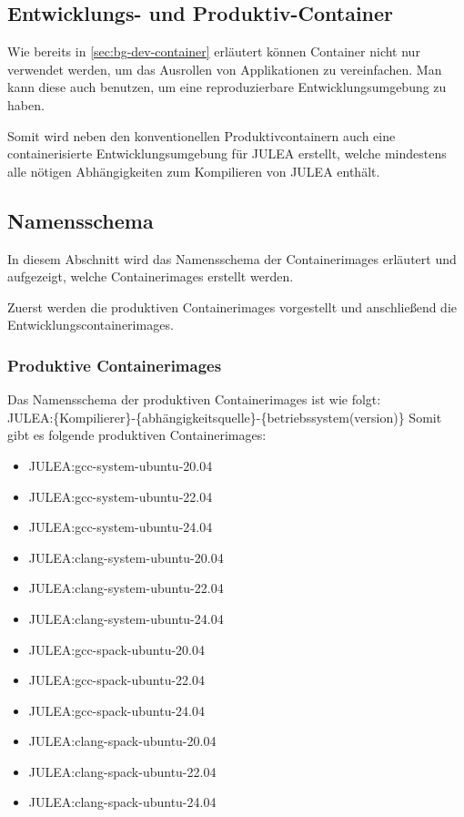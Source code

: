 \subsection{Entwicklungs- und Produktiv-Container}

Wie bereits in \cref{sec:bg-dev-container} erläutert können Container nicht nur verwendet werden, um das Ausrollen von Applikationen zu vereinfachen. Man kann diese auch benutzen, um eine reproduzierbare Entwicklungsumgebung zu haben. 

Somit wird neben den konventionellen Produktivcontainern auch eine containerisierte Entwicklungsumgebung für JULEA erstellt, welche mindestens alle nötigen Abhängigkeiten zum Kompilieren von JULEA enthält.

\subsection{Namensschema}

In diesem Abschnitt wird das Namensschema der Containerimages erläutert und aufgezeigt, welche Containerimages erstellt werden. 

Zuerst werden die produktiven Containerimages vorgestellt und anschließend die Entwicklungscontainerimages. 

\subsubsection{Produktive Containerimages}

Das Namensschema der produktiven Containerimages ist wie folgt: \\
JULEA:\{Kompilierer\}-\{abhängigkeitsquelle\}-\{betriebssystem(version)\}
Somit gibt es folgende produktiven Containerimages:

\begin{multicols}{2}
    \begin{itemize}
        \item JULEA:gcc-system-ubuntu-20.04  
        \item JULEA:gcc-system-ubuntu-22.04  
        \item JULEA:gcc-system-ubuntu-24.04  
        \item JULEA:clang-system-ubuntu-20.04
        \item JULEA:clang-system-ubuntu-22.04
        \item JULEA:clang-system-ubuntu-24.04
        \item JULEA:gcc-spack-ubuntu-20.04   
        \item JULEA:gcc-spack-ubuntu-22.04   
        \item JULEA:gcc-spack-ubuntu-24.04   
        \item JULEA:clang-spack-ubuntu-20.04 
        \item JULEA:clang-spack-ubuntu-22.04 
        \item JULEA:clang-spack-ubuntu-24.04 
    \end{itemize} 
\end{multicols}

